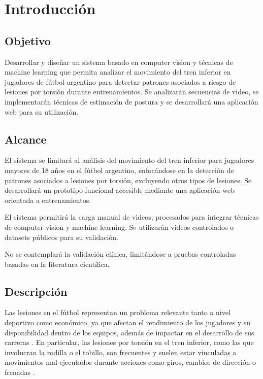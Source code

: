 \chapter{Introducción}

\section{Objetivo}

Desarrollar y diseñar un sistema basado en computer vision y técnicas de machine learning que permita analizar el movimiento del tren inferior en jugadores de fútbol argentino para detectar patrones asociados a riesgo de lesiones por torsión durante entrenamientos. Se analizarán secuencias de video, se implementarán técnicas de estimación de postura y se desarrollará una aplicación web para su utilización.

\section{Alcance}

El sistema se limitará al análisis del movimiento del tren inferior para jugadores mayores de 18 años en el fútbol argentino, enfocándose en la detección de patrones asociados a lesiones por torsión, excluyendo otros tipos de lesiones. Se desarrollará un prototipo funcional accesible mediante una aplicación web orientada a entrenamientos.

El sistema permitirá la carga manual de videos, procesados para integrar técnicas de computer vision y machine learning. Se utilizarán videos controlados o datasets públicos para su validación.

No se contemplará la validación clínica, limitándose a pruebas controladas basadas en la literatura científica.

\section{Descripción}

Las lesiones en el fútbol representan un problema relevante tanto a nivel deportivo como económico, ya que afectan el rendimiento de los jugadores y su disponibilidad dentro de los equipos, además de impactar en el desarrollo de sus carreras \parencite{HagglundEtAl2006}. En particular, las lesiones por torsión en el tren inferior, como las que involucran la rodilla o el tobillo, son frecuentes y suelen estar vinculadas a movimientos mal ejecutados durante acciones como giros, cambios de dirección o frenadas \parencite{BodenSheehan2022}.


